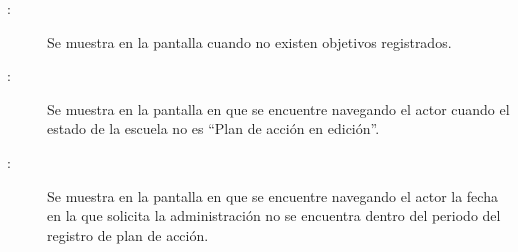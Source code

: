 	
\begin{description}
	\item[:] Se muestra en la pantalla  cuando no existen objetivos registrados.
	\item[:] Se muestra en la pantalla en que se encuentre navegando el actor cuando el estado de la escuela no es ``Plan de acción en edición''.
	\item[:] Se muestra en la pantalla en que se encuentre navegando el actor la fecha en la que solicita la administración no se encuentra dentro del periodo del registro de plan de acción.
	\end{description}
